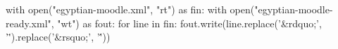 \documentclass[ngerman,a4paper,11pt]{article}
\begin{document}
\begin{python} 
with open("egyptian-moodle.xml", "rt") as fin:
    with open("egyptian-moodle-ready.xml", "wt") as fout:
        for line in fin:
            fout.write(line.replace('&rdquo;', '\"').replace('&rsquo;', '\''))
\end{python}
\end{document}
